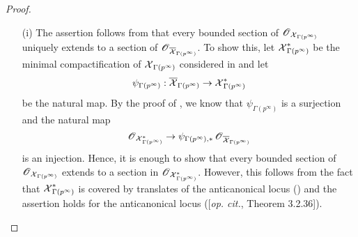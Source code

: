 \begin{proof}
\begin{enumerate}
\item[(i)]
The assertion follows from that every bounded section of $\operatorname{\mathscr{O}}_{\operatorname{\mathcal{X}}_{\Gamma(p^{\infty})}}$ uniquely extends to a section of $\operatorname{\mathscr{O}}_{\overline{\operatorname{\mathcal{X}}}_{\Gamma(p^{\infty})}}$. To show this, let $\operatorname{\mathcal{X}}_{\Gamma(p^{\infty})}^*$ be the minimal compactification of $\operatorname{\mathcal{X}}_{\Gamma(p^{\infty})}$ considered in \cite{Scholze-2015} and let \[
    \psi_{\Gamma(p^{\infty})}: \overline{\operatorname{\mathcal{X}}}_{\Gamma(p^{\infty})} \rightarrow \operatorname{\mathcal{X}}_{\Gamma(p^{\infty})}^*
\] be the natural map. By the proof of \cite[Proposition 1.11]{Pilloni-Stroh-CoherentCohomologyandGaloisRepresentations}, we know that $\psi_{\Gamma(p^{\infty})}$ is a surjection and the natural map \[
    \operatorname{\mathscr{O}}_{\operatorname{\mathcal{X}}_{\Gamma(p^{\infty})}^*} \rightarrow \psi_{\Gamma(p^{\infty}), *}\operatorname{\mathscr{O}}_{\overline{\operatorname{\mathcal{X}}}_{\Gamma(p^{\infty})}}
\] is an injection. Hence, it is enough to show that every bounded section of $\operatorname{\mathscr{O}}_{\operatorname{\mathcal{X}}_{\Gamma(p^{\infty})}}$ extends to a section in $\operatorname{\mathscr{O}}_{\operatorname{\mathcal{X}}_{\Gamma(p^{\infty})}^*}$. However, this follows from the fact that $\operatorname{\mathcal{X}}_{\Gamma(p^{\infty})}^*$ is covered by translates of the anticanonical locus (\cite[Lemma 3.3.11]{Scholze-2015}) and the assertion holds for the anticanonical locus ([\emph{op. cit.}, Theorem 3.2.36]).


\end{enumerate}
\end{proof}
